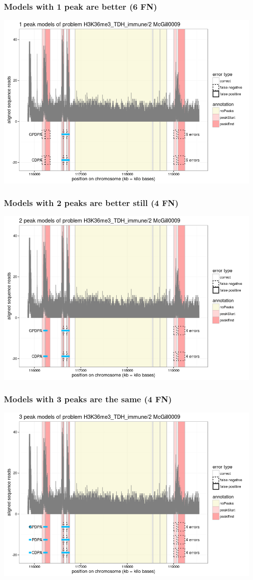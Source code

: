 \documentclass{beamer}
\begin{document}
\begin{frame}
  \frametitle{Models with 1 peak are better (6 FN)}
  \includegraphics[width=\textwidth]{figure-min-train-error-problem5-1peaks}
\end{frame}

\begin{frame}
  \frametitle{Models with 2 peaks are better still (4 FN)}
  \includegraphics[width=\textwidth]{figure-min-train-error-problem5-2peaks}
\end{frame}

\begin{frame}
  \frametitle{Models with 3 peaks are the same (4 FN)}
  \includegraphics[width=\textwidth]{figure-min-train-error-problem5-3peaks}
\end{frame}
\end{document}
